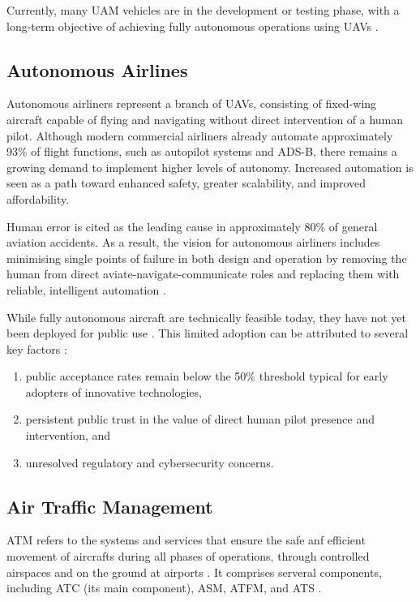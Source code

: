Currently, many \gls{UAM} vehicles are in the development or testing phase, with a long-term objective of achieving fully autonomous operations using \glspl{UAV} \cite{Vernol_2023}.


\subsection{Autonomous Airlines}

Autonomous airliners represent a branch of \glspl{UAV}, consisting of fixed-wing aircraft capable of flying and navigating without direct intervention of a human pilot.
Although modern commercial airliners already automate approximately 93\% of flight functions, such as autopilot systems and \gls{ADS-B}, there remains a growing demand to implement higher levels of autonomy.
Increased automation is seen as a path toward enhanced safety, greater scalability, and improved affordability.

Human error is cited as the leading cause in approximately 80\% of general aviation accidents. 
As a result, the vision for autonomous airliners includes minimising single points of failure in both design and operation by removing the human from direct aviate-navigate-communicate roles and replacing them with reliable, intelligent automation \cite{wisk2022autonomous}. 

While fully autonomous aircraft are technically feasible today, they have not yet been deployed for public use \cite{wisk2022autonomous}.
This limited adoption can be attributed to several key factors \cite{Vance_2019}:
\begin{enumerate}[label=\alph*)]
    \item public acceptance rates remain below the 50\% threshold typical for early adopters of innovative technologies,
    \item persistent public trust in the value of direct human pilot presence and intervention, and
    \item unresolved regulatory and cybersecurity concerns.
\end{enumerate}


\subsection{Air Traffic Management}

\Gls{ATM} refers to the systems and services that ensure the safe anf efficient movement of aircrafts during all phases of operations, through controlled airspaces and on the ground at airports \cite{skybraryATM}. 
It comprises serveral components, including \gls{ATC} (its main component), \gls{ASM}, \gls{ATFM}, and \gls{ATS} \cite{Schuchardt_2023}.

